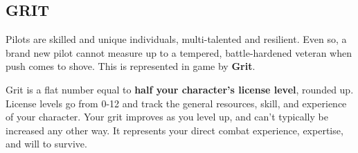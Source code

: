 \subsection{GRIT}

Pilots are skilled and unique individuals, multi-talented and resilient. Even so, a brand new pilot
cannot measure up to a tempered, battle-hardened veteran when push comes to shove. This is
represented in game by \textbf{Grit}.

Grit is a flat number equal to \textbf{half your character’s license level}, rounded up. License levels go
from 0-12 and track the general resources, skill, and experience of your character. Your grit
improves as you level up, and can’t typically be increased any other way. It represents your direct
combat experience, expertise, and will to survive.